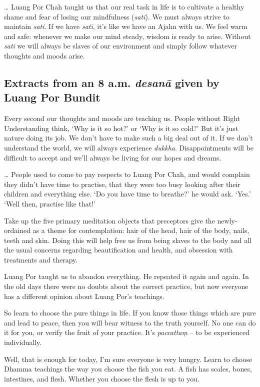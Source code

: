 \ldots{} Luang Por Chah taught us that our real task in life is to
cultivate a healthy shame and fear of losing our mindfulness
(\emph{sati}). We must always strive to maintain \emph{sati}. If we have
\emph{sati}, it's like we have an Ajahn with us. We feel warm and safe:
whenever we make our mind steady, wisdom is ready to arise. Without
\emph{sati} we will always be slaves of our environment and simply
follow whatever thoughts and moods arise.

\subsection*{Extracts from an 8 a.m. \emph{desanā} given by Luang Por Bundit}

Every second our thoughts and moods are teaching us. People without
Right Understanding think, `Why is it so hot?' or `Why is it so cold?'
But it's just nature doing its job. We don't have to make such a big
deal out of it. If we don't understand the world, we will always
experience \emph{dukkha}. Disappointments will be difficult to accept
and we'll always be living for our hopes and dreams. 

\ldots{} People used to come to pay respects to Luang Por Chah, and
would complain they didn't have time to practise, that they were too
busy looking after their children and everything else. `Do you have time
to breathe?' he would ask. `Yes.' `Well then, practise like that!'

Take up the five primary meditation objects that preceptors give the
newly-ordained as a theme for contemplation: hair of the head, hair of
the body, nails, teeth and skin. Doing this will help free us from being
slaves to the body and all the usual concerns regarding beautification
and health, and obsession with treatments and therapy. 

Luang Por taught us to abandon everything. He repeated it again and
again. In the old days there were no doubts about the correct practice, 
but now everyone has a different opinion about Luang Por's teachings. 

So learn to choose the pure things in life. If you know those things
which are pure and lead to peace, then you will bear witness to the
truth yourself. No one can do it for you, or verify the fruit of your
practice. It's \emph{paccattaṃ} -- to be experienced individually. 

Well, that is enough for today, I'm sure everyone is very hungry. Learn
to choose Dhamma teachings the way you choose the fish you eat. A fish
has scales, bones, intestines, and flesh. Whether you choose the flesh
is up to you. 

